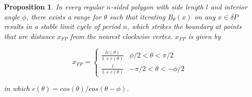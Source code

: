 \documentclass[letterpaper, 10 pt, conference]{ieeeconf}  %
\newtheorem{proposition}[theorem]{\bf Proposition}
\begin{document}
\begin{proposition} \label{Proposition:1}
In every regular $n$-sided polygon with side
length $l$ and interior angle $\phi$, there exists a range for $\theta$ such
that iterating $B_{\theta}(x)$ on any $x \in \delta P$ results in a stable limit
cycle of period $n$, which strikes the boundary at points that are distance $x_{FP}$
from the nearest clockwise vertex. $x_{FP}$ is given by

\begin{equation}
x_{FP} = 
\begin{cases}
        \frac{l c(\theta)}{1 + c(\theta)} & \phi/2 < \theta
< \pi/2 \\
        \frac{l}{1+c(\theta)} & -\pi/2 < \theta
< -\phi/2
\end{cases}
\end{equation}

\noindent in which $c(\theta) = cos(\theta) / cos(\theta - \phi)$.

\end{proposition}
\end{document}
